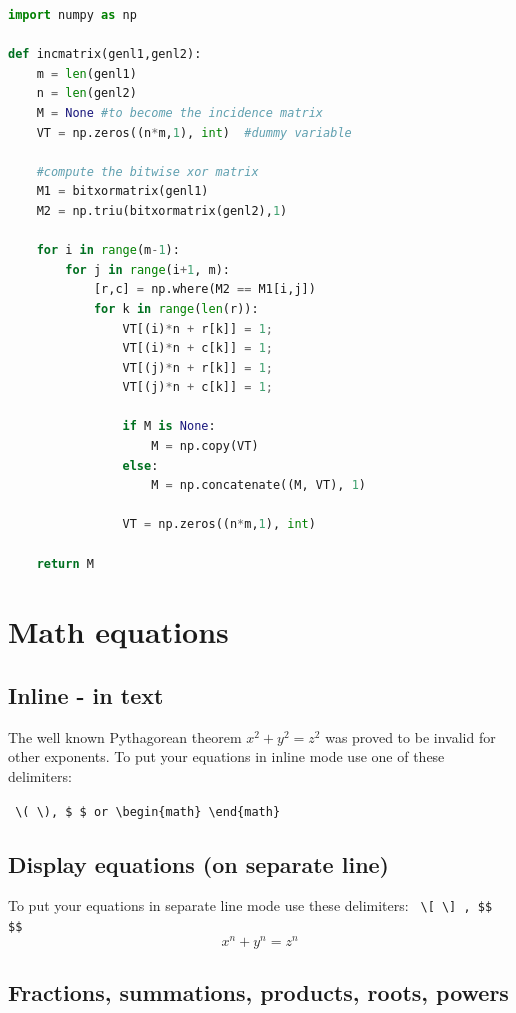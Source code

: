 \documentclass{article}
\begin{document}
\begin{lstlisting}[language=Python]
import numpy as np
    
def incmatrix(genl1,genl2):
    m = len(genl1)
    n = len(genl2)
    M = None #to become the incidence matrix
    VT = np.zeros((n*m,1), int)  #dummy variable
    
    #compute the bitwise xor matrix
    M1 = bitxormatrix(genl1)
    M2 = np.triu(bitxormatrix(genl2),1) 

    for i in range(m-1):
        for j in range(i+1, m):
            [r,c] = np.where(M2 == M1[i,j])
            for k in range(len(r)):
                VT[(i)*n + r[k]] = 1;
                VT[(i)*n + c[k]] = 1;
                VT[(j)*n + r[k]] = 1;
                VT[(j)*n + c[k]] = 1;
                
                if M is None:
                    M = np.copy(VT)
                else:
                    M = np.concatenate((M, VT), 1)
                
                VT = np.zeros((n*m,1), int)
    
    return M
\end{lstlisting}

\section{Math equations}
\subsection{Inline - in text}
The well known Pythagorean theorem \(x^2 + y^2 = z^2\) was 
proved to be invalid for other exponents. To put your equations in inline mode use one of these delimiters:

\verb| \( \), $ $ or \begin{math} \end{math}|




\subsection{Display equations (on separate line)}
To put your equations in separate line mode use these delimiters:
\verb| \[ \] , $$ $$|
\[ x^n + y^n = z^n \]

\subsection{Fractions, summations, products, roots, powers}
\end{document}
